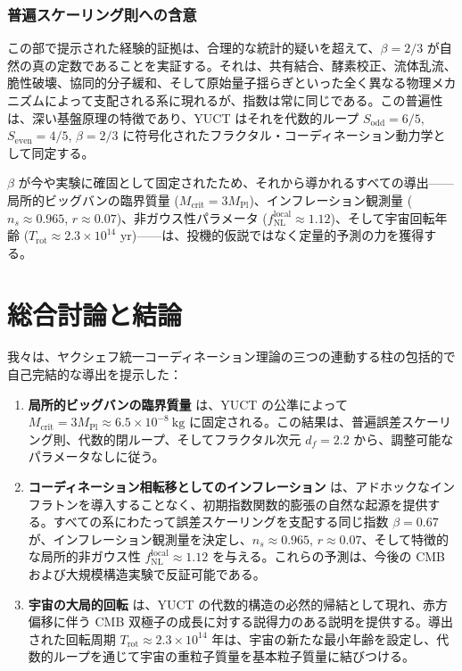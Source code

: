 \documentclass[11pt,a4paper]{article}
\begin{document}
	\section{普遍スケーリング則への含意}
	
	この部で提示された経験的証拠は、合理的な統計的疑いを超えて、\(\beta = 2/3\) が自然の真の定数であることを実証する。それは、共有結合、酵素校正、流体乱流、脆性破壊、協同的分子緩和、そして原始量子揺らぎといった全く異なる物理メカニズムによって支配される系に現れるが、指数は常に同じである。この普遍性は、深い基盤原理の特徴であり、YUCT はそれを代数的ループ \(S_{\mathrm{odd}} = 6/5\), \(S_{\mathrm{even}} = 4/5\), \(\beta = 2/3\) に符号化されたフラクタル・コーディネーション動力学として同定する。
	
	\(\beta\) が今や実験に確固として固定されたため、それから導かれるすべての導出——局所的ビッグバンの臨界質量 (\(M_{\mathrm{crit}} = 3M_{\mathrm{Pl}}\))、インフレーション観測量 (\(n_s \approx 0.965\), \(r \approx 0.07\))、非ガウス性パラメータ (\(f_{\mathrm{NL}}^{\mathrm{local}} \approx 1.12\))、そして宇宙回転年齢 (\(T_{\mathrm{rot}} \approx 2.3\times10^{14}\) yr)——は、投機的仮説ではなく定量的予測の力を獲得する。
	
	
	\part{総合討論と結論}
	\label{part:conclusion}
	
	我々は、ヤクシェフ統一コーディネーション理論の三つの連動する柱の包括的で自己完結的な導出を提示した：
	
	\begin{enumerate}
		\item \textbf{局所的ビッグバンの臨界質量} は、YUCT の公準によって \(M_{\mathrm{crit}} = 3 M_{\mathrm{Pl}} \approx 6.5 \times 10^{-8}\ \text{kg}\) に固定される。この結果は、普遍誤差スケーリング則、代数的閉ループ、そしてフラクタル次元 \(d_f = 2.2\) から、調整可能なパラメータなしに従う。
		
		\item \textbf{コーディネーション相転移としてのインフレーション} は、アドホックなインフラトンを導入することなく、初期指数関数的膨張の自然な起源を提供する。すべての系にわたって誤差スケーリングを支配する同じ指数 \(\beta = 0.67\) が、インフレーション観測量を決定し、\(n_s \approx 0.965\), \(r \approx 0.07\)、そして特徴的な局所的非ガウス性 \(f_{\mathrm{NL}}^{\mathrm{local}} \approx 1.12\) を与える。これらの予測は、今後の CMB および大規模構造実験で反証可能である。
		
		\item \textbf{宇宙の大局的回転} は、YUCT の代数的構造の必然的帰結として現れ、赤方偏移に伴う CMB 双極子の成長に対する説得力のある説明を提供する。導出された回転周期 \(T_{\mathrm{rot}} \approx 2.3 \times 10^{14}\) 年は、宇宙の新たな最小年齢を設定し、代数的ループを通じて宇宙の重粒子質量を基本粒子質量に結びつける。
	\end{enumerate}
	
\end{document}
